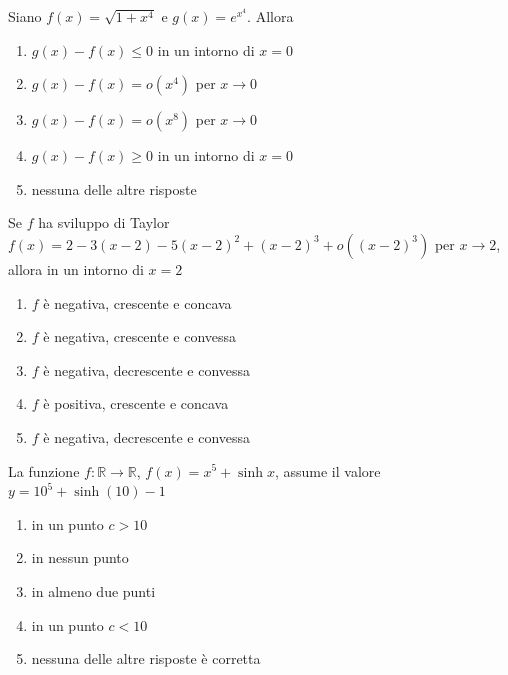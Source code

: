 \begin{quiz}
Siano $f(x)=\sqrt{1+x^4}$ e $g(x)=e^{x^4}$. Allora
\begin{enumerate}[label=\alph*),leftmargin=1.3cm,itemsep=3pt,topsep=5pt]
\item $g(x)-f(x)\le0$ in un intorno di $x=0$
\item $g(x)-f(x)=o(x^4)$ per $x\to0$
\item $g(x)-f(x)=o(x^8)$ per $x\to0$
\item $g(x)-f(x)\ge0$ in un intorno di $x=0$
\item nessuna delle altre risposte
\end{enumerate}
\end{quiz}

\begin{quiz}
Se $f$ ha sviluppo di Taylor $f(x)=2-3(x-2)-5(x-2)^2+(x-2)^3+o((x-2)^3)$ per $x\to2$, allora in un intorno di $x=2$
\begin{enumerate}[label=\alph*),leftmargin=1.3cm,itemsep=3pt,topsep=5pt]
\item $f$ \`e negativa, crescente e concava
\item $f$ \`e negativa, crescente e convessa
\item $f$ \`e negativa, decrescente e convessa
\item $f$ \`e positiva, crescente e concava
\item $f$ \`e negativa, decrescente e convessa
\end{enumerate}
\end{quiz}

\begin{quiz}
La funzione $f:\mathbb R\to\mathbb R$, $f(x)=x^5+\sinh x$, assume il valore $y=10^5+\sinh(10)-1$
\begin{enumerate}[label=\alph*),leftmargin=1.3cm,itemsep=3pt,topsep=5pt]
\item in un punto $c>10$
\item in nessun punto
\item in almeno due punti
\item in un punto $c<10$
\item nessuna delle altre risposte \`e corretta
\end{enumerate}
\end{quiz}

